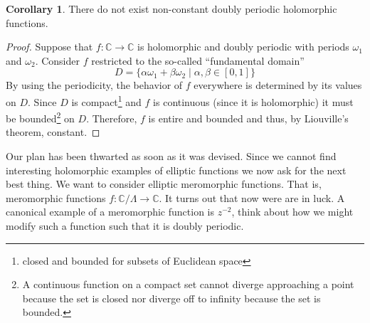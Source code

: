 \documentclass{article}
\newcommand{\C}{\mathbb{C}}
\theoremstyle{definition}
\newtheorem{corollary}[theorem]{Corollary}
\begin{document}
\begin{corollary}
There do not exist non-constant doubly periodic holomorphic functions.
\end{corollary}

\begin{proof}
Suppose that $f : \C \to \C$ is holomorphic and doubly periodic with periods $\omega_1$ and $\omega_2$. Consider $f$ restricted to the so-called ``fundamental domain''
\[ D = \{ \alpha \omega_1 + \beta \omega_2 \mid \alpha, \beta \in [0, 1] \} \]
By using the periodicity, the behavior of $f$ everywhere is determined by its values on $D$. 
Since $D$ is compact\footnote{closed and bounded for subsets of Euclidean space} and $f$ is continuous (since it is holomorphic) it must be bounded\footnote{A continuous function on a compact set cannot diverge approaching a point because the set is closed nor diverge off to infinity because the set is bounded.} on $D$. Therefore, $f$ is entire and bounded and thus, by Liouville's theorem, constant. 
\end{proof}
Our plan has been thwarted as soon as it was devised. Since we cannot find interesting holomorphic examples of elliptic functions we now ask for the next best thing.
We want to consider elliptic meromorphic functions. That is, meromorphic functions $f : \C / \Lambda \to \C$. It turns out that now were are in luck. A canonical example of a meromorphic function is $z^{-2}$, think about how we might modify such a function such that it is doubly periodic.
\end{document}
